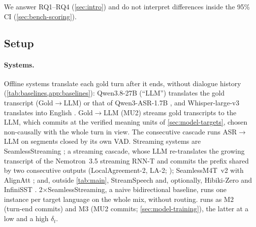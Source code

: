 

We answer RQ1--RQ4 (\cref{sec:intro}) and do not interpret differences inside the 95\% CI (\cref{sec:bench-scoring}).

\subsection{Setup}\label{sec:exp-setup}

\paragraph{Systems.}
Offline systems translate each gold turn after it ends, without dialogue history (\cref{tab:baselines,app:baselines}): Qwen3.8-27B (``LLM'') translates the gold transcript (Gold$\to$LLM) or that of Qwen3-ASR-1.7B \citep[ASR$\to$LLM;][]{shi2026qwen3asr}, and Whisper-large-v3 translates into English \citep[Whisper ST;][]{radford2023robust}.
Gold$\to$LLM (MU2) streams gold transcripts to the LLM, which commits at the verified meaning units of \cref{sec:model-targets}, chosen non-causally with the whole turn in view.
The consecutive cascade runs ASR$\to$LLM on segments closed by its own VAD.
Streaming systems are SeamlessStreaming \citep{seamless2023seamless}; a streaming cascade, whose LLM re-translates the growing transcript of the Nemotron~3.5 streaming RNN-T \citep{nvidia2026nemotron35asr} and commits the prefix shared by two consecutive outputs (LocalAgreement-2, LA-2; \citealp{liu2020lowlatency,polak2022cuni}); SeamlessM4T~v2 \citep{seamless2025joint} with AlignAtt \citep[M4T v2 + AlignAtt;][]{papi2023alignatt}; and, outside \cref{tab:main}, StreamSpeech \citep[\deen;][]{zhang2024streamspeech} and, optionally, Hibiki-Zero \citep[\deen, text output;][]{labiausse2026simultaneous} and InfiniSST \citep[\ende;][]{ouyang2025infinisst}.
2$\times$SeamlessStreaming, a naive bidirectional baseline, runs one instance per target language on the whole mix, without routing.
\model runs as M2 (turn-end commits) and M3 (MU2 commits; \cref{sec:model-training}), the latter at a low and a high $\delta_t$.

